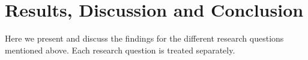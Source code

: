 \section{Results, Discussion and Conclusion}

Here we present and discuss the findings for the different research questions mentioned above. Each research question is treated separately.










